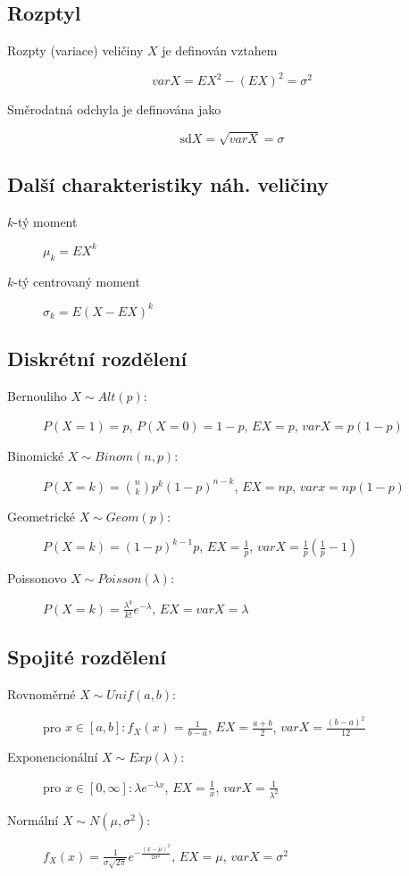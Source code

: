 \subsection{Rozptyl}

Rozpty (variace) veličiny $X$ je definován vztahem

$$
    var X = EX^2 - (EX)^2 = \sigma^2
$$

Směrodatná odchyla je definována jako

$$
    \textrm{sd} X = \sqrt{var X} = \sigma
$$

\subsection{Další charakteristiky náh. veličiny}

\begin{description}
    \item[$k$-tý moment] $\mu_k = EX^k$
    \item[$k$-tý centrovaný moment] $\sigma_k = E(X - EX)^k$
\end{description}

\subsection{Diskrétní rozdělení}

\begin{description}
    \item[Bernouliho $X \sim Alt(p)$:] $P(X = 1) = p$, $P(X = 0) = 1 - p$, $EX = p$, $var X = p(1-p)$
    \item[Binomické $X \sim Binom(n,p)$:] $P(X = k) = \binom{n}{k}p^k(1-p)^{n-k}$, $EX = np$, $var x = np(1-p)$
    \item[Geometrické $X \sim Geom(p)$:] $P(X=k)=(1-p)^{k-1}p$, $EX = \frac{1}{p}$, $var X = \frac{1}{p}(\frac{1}{p} - 1)$
    \item[Poissonovo $X \sim Poisson(\lambda)$:] $P(X = k) = \frac{\lambda^k}{k!}e^{-\lambda}$, $EX = var X = \lambda$
\end{description}

\subsection{Spojité rozdělení}

\begin{description}
    \item[Rovnoměrné $X \sim Unif(a,b)$:] pro $x\in[a,b]: f_X(x) = \frac{1}{b-a}$, $EX = \frac{a+b}{2}$, $var X = \frac{(b-a)^2}{12}$
    \item[Exponencionální $X \sim Exp(\lambda)$:] pro $x\in[0,\infty]: \lambda e^{-\lambda x}$, $EX = \frac{1}{x}$, $var X = \frac{1}{\lambda^2}$
    \item[Normální $X \sim N(\mu, \sigma^2)$:] $f_X(x)=\frac{1}{\sigma\sqrt{2\pi}}e^{-\frac{(x-\mu)^2}{2\sigma^2}}$, $EX = \mu$, $var X = \sigma^2$
\end{description}
